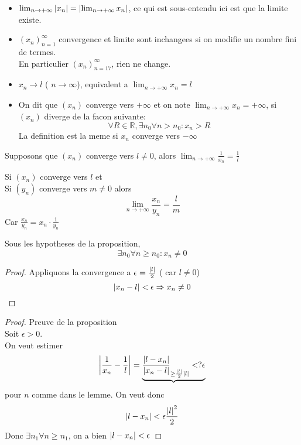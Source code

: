 \documentclass[../main.tex]{subfiles}
\begin{document}
\begin{rmq}
\begin{itemize}
\item $\lim_{n \to  + \infty} \left\vert x_n\right\vert  = \left\vert\lim_{n \to  + \infty} x_n\right\vert$, ce qui est sous-entendu ici est que la limite existe.\\
\item $(x_n)_{n=1}^{\infty }$ convergence et limite sont inchangees si on modifie un nombre fini de termes.\\
	En  particulier  $(x_n)_{n=17}^{\infty }$, rien ne change.
\item $x_n \to l$ ( $n\to \infty $), equivalent a $\lim_{n \to  + \infty} x_{n} =l$
\item On dit que $(x_n)$ converge vers $+\infty $ et on note $\lim_{n \to  + \infty} x_n = + \infty $, si $(x_n)$ diverge de la facon suivante:
	\[ 
	\forall R \in \mathbb{R}, \exists n_0 \forall n>n_0: x_n >R
	\]
	La definition est la meme si $x_n$ converge vers $- \infty $

	
\end{itemize}

\end{rmq}
\begin{propo}\label{propo:inversion_d_une_limite}
	Supposons que $(x_n)$ converge vers $l \neq 0$, alors $\lim_{n \to  + \infty} \frac{1}{x_n}= \frac{1}{l}$
\end{propo}
\begin{crly}
	Si $(x_n)$ converge vers $l$ et\\
	Si $(y_n)$ converge vers $m \neq 0$ alors
	\[ 
	\lim_{n \to  + \infty} \frac{x_n}{y_n} = \frac{l}{m}
	\]
	Car $\frac{x_n}{y_n} = x_n \cdot \frac{1}{y_n}$
\end{crly}
\begin{lemma}
Sous les hypotheses de la proposition,
\[ 
\exists n_0 \forall n \geq n_0 : x_n \neq 0
\]

\end{lemma}
\begin{proof}
	Appliquons la convergence a $\epsilon = \frac{\left\vert l\right\vert}{2}$ ( car $l \neq 0$)
	\[ 
		\left\vert x_n -l\right\vert < \epsilon \Rightarrow x_n \neq 0	
	\]
	
\end{proof}
\begin{proof}
Preuve de la proposition\\
Soit $\epsilon > 0$.\\
On veut estimer
\[ 
	\left\vert\frac{1}{x_n} - \frac{1}{l}\right\vert = \underbrace{\frac{\left\vert l-x_n\right\vert}{\left\vert x_n -l\right\vert}_{\geq \frac{\left\vert l\right\vert}{2} \left\vert l\right\vert} <? \epsilon}
\]
pour $n$ comme dans le lemme.
On veut donc 
 \[ 
	 \left\vert l-x_n\right\vert < \epsilon \frac{\left\vert l\right\vert^{2}}{2}
\]
Donc $\exists n_1 \forall n \geq n_1$, on a bien $\left\vert l-x_n\right\vert < \epsilon$
\end{proof}
\end{document}
